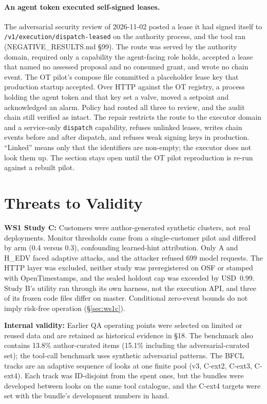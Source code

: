 \documentclass[10pt,twocolumn]{article}
\begin{document}
\paragraph{An agent token executed self-signed leases.}
The adversarial security review of 2026-11-02 posted a lease it had signed
itself to \texttt{/v1/execution/dispatch-leased} on the authority process,
and the tool ran (NEGATIVE\_RESULTS.md \S99). The route was served by the
authority domain, required only a capability the agent-facing role holds,
accepted a lease that named no assessed proposal and no consumed grant, and
wrote no chain event. The OT pilot's compose file committed a placeholder
lease key that production startup accepted. Over HTTP against the OT
registry, a process holding the agent token and that key set a valve,
moved a setpoint and acknowledged an alarm. Policy had routed all three
to review, and the audit chain still verified as intact. The repair restricts
the route to the executor domain and a service-only \texttt{dispatch}
capability, refuses unlinked leases, writes chain events before and after
dispatch, and refuses weak signing keys in production. ``Linked'' means only
that the identifiers are non-empty; the executor does not look them up.
The section stays open until the OT pilot reproduction is re-run against a
rebuilt pilot.

\section{Threats to Validity}
\label{sec:threats}

\textbf{WS1 Study C:} Customers were author-generated synthetic
clusters, not real deployments. Monitor thresholds came from a
single-customer pilot and differed by arm (0.4 versus 0.3),
confounding learned-hint attribution. Only A and H\_EDV faced
adaptive attacks, and the attacker refused 699 model requests.
The HTTP layer was excluded, neither study was preregistered on OSF
or stamped with OpenTimestamps, and the sealed holdout cap was exceeded
by USD~0.99. Study B's utility ran through its own harness, not the
execution API, and three of its frozen code files differ on master.
Conditional zero-event bounds do not imply risk-free operation
(\S\ref{sec:ws1c}).


\textbf{Internal validity:} Earlier QA operating points were selected
on limited or reused data and are retained as historical evidence in
 \S18. The benchmark also contains 13.8\%
author-curated items (15.1\% including the adversarial-curated set);
the tool-call benchmark uses synthetic adversarial patterns. The BFCL
tracks are an adaptive sequence of looks at one finite pool (v3, C-ext2,
C-ext3, C-ext4). Each track was ID-disjoint from the spent ones, but the
bundles were developed between looks on the same tool catalogue, and the
C-ext4 targets were set with the bundle's development numbers in hand.
\end{document}
